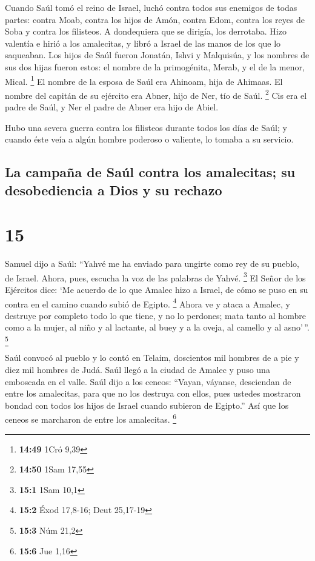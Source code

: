  Cuando Saúl tomó el reino de Israel, luchó contra todos
sus enemigos de todas partes: contra Moab, contra los hijos de Amón,
contra Edom, contra los reyes de Soba y contra los filisteos. A
dondequiera que se dirigía, los derrotaba.  Hizo valentía
e hirió a los amalecitas, y libró a Israel de las manos de los que lo
saqueaban.  Los hijos de Saúl fueron Jonatán, Ishvi y
Malquisúa, y los nombres de sus dos hijas fueron estos: el nombre de la
primogénita, Merab, y el de la menor, Mical. \footnote{\textbf{14:49}
  1Cró 9,39}  El nombre de la esposa de Saúl era Ahinoam,
hija de Ahimaas. El nombre del capitán de su ejército era Abner, hijo de
Ner, tío de Saúl. \footnote{\textbf{14:50} 1Sam 17,55} 
Cis era el padre de Saúl, y Ner el padre de Abner era hijo de Abiel.

 Hubo una severa guerra contra los filisteos durante
todos los días de Saúl; y cuando éste veía a algún hombre poderoso o
valiente, lo tomaba a su servicio.

\hypertarget{la-campauxf1a-de-sauxfal-contra-los-amalecitas-su-desobediencia-a-dios-y-su-rechazo}{%
\subsection{La campaña de Saúl contra los amalecitas; su desobediencia a
Dios y su
rechazo}\label{la-campauxf1a-de-sauxfal-contra-los-amalecitas-su-desobediencia-a-dios-y-su-rechazo}}

\hypertarget{section-14}{%
\section{15}\label{section-14}}

 Samuel dijo a Saúl: ``Yahvé me ha enviado para ungirte
como rey de su pueblo, de Israel. Ahora, pues, escucha la voz de las
palabras de Yahvé. \footnote{\textbf{15:1} 1Sam 10,1}  El
Señor de los Ejércitos dice: `Me acuerdo de lo que Amalec hizo a Israel,
de cómo se puso en su contra en el camino cuando subió de Egipto.
\footnote{\textbf{15:2} Éxod 17,8-16; Deut 25,17-19} 
Ahora ve y ataca a Amalec, y destruye por completo todo lo que tiene, y
no lo perdones; mata tanto al hombre como a la mujer, al niño y al
lactante, al buey y a la oveja, al camello y al asno'\,''. \footnote{\textbf{15:3}
  Núm 21,2}

 Saúl convocó al pueblo y lo contó en Telaim, doscientos
mil hombres de a pie y diez mil hombres de Judá.  Saúl
llegó a la ciudad de Amalec y puso una emboscada en el valle.
 Saúl dijo a los ceneos: ``Vayan, váyanse, desciendan de
entre los amalecitas, para que no los destruya con ellos, pues ustedes
mostraron bondad con todos los hijos de Israel cuando subieron de
Egipto.'' Así que los ceneos se marcharon de entre los amalecitas.
\footnote{\textbf{15:6} Jue 1,16}

